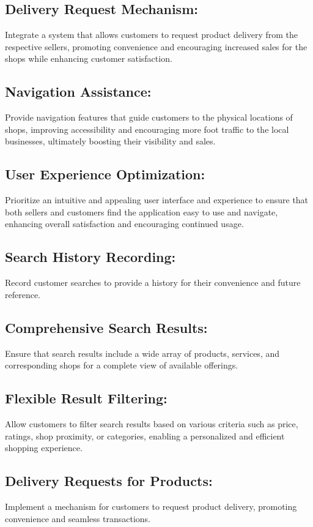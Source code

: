 \subsection{Delivery Request Mechanism:} 
Integrate a system that allows customers to request product delivery from the respective sellers, promoting convenience and encouraging increased sales for the shops while enhancing customer satisfaction.

\subsection{Navigation Assistance:} 
Provide navigation features that guide customers to the physical locations of shops, improving accessibility and encouraging more foot traffic to the local businesses, ultimately boosting their visibility and sales.

\subsection{User Experience Optimization:} 
Prioritize an intuitive and appealing user interface and experience to ensure that both sellers and customers find the application easy to use and navigate, enhancing overall satisfaction and encouraging continued usage.

\subsection{Search History Recording:}
Record customer searches to provide a history for their convenience and future reference.

\subsection{Comprehensive Search Results:}
Ensure that search results include a wide array of products, services, and corresponding shops for a complete view of available offerings.

\subsection{Flexible Result Filtering:}
Allow customers to filter search results based on various criteria such as price, ratings, shop proximity, or categories, enabling a personalized and efficient shopping experience.

\subsection{Delivery Requests for Products:}
Implement a mechanism for customers to request product delivery, promoting convenience and seamless transactions.

